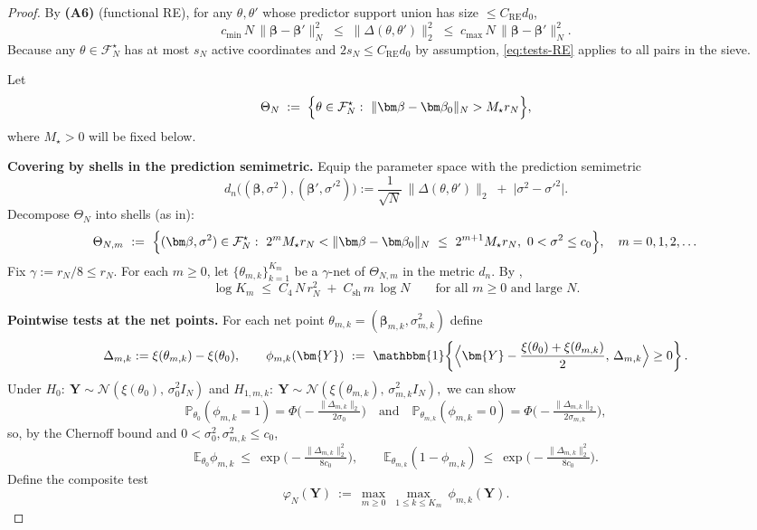 \documentclass[11pt]{article}
\theoremstyle{plain}
\theoremstyle{definition}
\theoremstyle{plain}
\begin{document}
\begin{proof}
By \textbf{(A6)} (functional RE), for any $\theta,\theta'$ whose predictor support union has size $\le C_{\mathrm{RE}}d_0$,
\begin{equation}\label{eq:tests-RE}
c_{\min}\,N\,\|\bm\beta-\bm\beta'\|_N^2 \;\le\; \|\Delta(\theta,\theta')\|_2^2 \;\le\; c_{\max}\,N\,\|\bm\beta-\bm\beta'\|_N^2.
\end{equation}
Because any $\theta\in\mathcal F_N^\star$ has at most $s_N$ active coordinates and $2s_N\le C_{\mathrm{RE}}d_0$ by assumption, \eqref{eq:tests-RE} applies to all pairs in the sieve.

Let
\[
\Theta_N \;:=\; \Bigl\{\theta\in\mathcal F_N^\star:\ \|\bm\beta-\bm\beta_0\|_N> M_\star r_N\Bigr\},
\]
where $M_\star>0$ will be fixed below.

\medskip
\textbf{Covering by shells in the prediction semimetric.}
Equip the parameter space with the prediction semimetric
\[
d_n\bigl((\bm\beta,\sigma^2),(\bm\beta',{\sigma'}^{2})\bigr)
:= \frac{1}{\sqrt N}\,\big\|\Delta(\theta,\theta')\big\|_2 \;+\; \big|\sigma^2-{\sigma'}^{2}\big|.
\]
Decompose $\Theta_N$ into shells (as in):
\[
\Theta_{N,m}\ :=\ \Bigl\{(\bm\beta,\sigma^2)\in\mathcal F_N^\star:\ 
 2^{m} M_\star r_N < \|\bm\beta-\bm\beta_0\|_{N}\ \le\ 2^{m+1} M_\star r_N,\ 
 0<\sigma^2\le c_0\Bigr\},\quad m=0,1,2,\dots
\]
Fix $\gamma:=r_N/8 \le r_N$. For each $m\ge 0$, let $\{\theta_{m,k}\}_{k=1}^{K_m}$ be a $\gamma$-net of $\Theta_{N,m}$ in the metric $d_n$.
By ,
\begin{equation}\label{eq:tests-Km}
\log K_m \;\le\; C_4\,N\,r_N^2\;+\;C_{\mathrm{sh}}\,m\,\log N
\qquad\text{for all }m\ge 0\text{ and large }N.
\end{equation}

\medskip
\textbf{Pointwise tests at the net points.}
For each net point $\theta_{m,k}=(\bm\beta_{m,k},\sigma_{m,k}^2)$ define
\[
\Delta_{m,k}:=\xi(\theta_{m,k})-\xi(\theta_0),\qquad
\phi_{m,k}(\bm{Y})\ :=\ \mathbbm{1}\!\left\{
\Big\langle \bm{Y}-\frac{\xi(\theta_0)+\xi(\theta_{m,k})}{2},\, \Delta_{m,k}\Big\rangle \ge 0
\right\}.
\]
Under $H_0:\ \bm{Y}\sim \mathcal N(\xi(\theta_0),\,\sigma_0^2 I_N)$ and $H_{1,m,k}:\ \bm{Y}\sim \mathcal N(\xi(\theta_{m,k}),\,\sigma_{m,k}^2 I_N),$ we can show
\[
\mathbb P_{\theta_0}(\phi_{m,k}=1)=\Phi\Big(-\tfrac{\|\Delta_{m,k}\|_2}{2\sigma_0}\Big)
\quad\text{and}\quad
\mathbb P_{\theta_{m,k}}(\phi_{m,k}=0)=\Phi\Big(-\tfrac{\|\Delta_{m,k}\|_2}{2\sigma_{m,k}}\Big),
\]
so, by the Chernoff bound and $0<\sigma_0^2,\sigma_{m,k}^2\le c_0$,
\begin{equation}\label{eq:tests-NP}
\mathbb E_{\theta_0}\phi_{m,k}\ \le\ \exp\!\Big(-\tfrac{\|\Delta_{m,k}\|_2^2}{8c_0}\Big),
\qquad
\mathbb E_{\theta_{m,k}}(1-\phi_{m,k})\ \le\ \exp\!\Big(-\tfrac{\|\Delta_{m,k}\|_2^2}{8c_0}\Big).
\end{equation}
Define the composite test
\[
\varphi_N(\bm{Y})\ :=\ \max_{m\ge 0}\ \max_{1\le k\le K_m}\ \phi_{m,k}(\bm{Y}).
\]


\end{proof}
\end{document}
